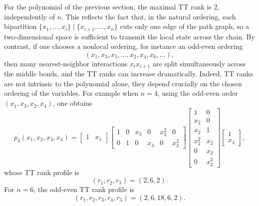 \documentclass[11pt,a4paper]{article}
\theoremstyle{definition}
\begin{document}
For the polynomial of the previous section, the maximal TT rank is \(2\), independently of \(n\). This reflects the fact that, in the natural ordering, each bipartition \(\{x_1,\dots,x_i\}\mid\{x_{i+1},\dots,x_n\}\) cuts only one edge of the path graph, so a two-dimensional space is sufficient to transmit the local state across the chain. By contrast, if one chooses a nonlocal ordering, for instance an odd-even ordering
\[
(x_1,x_3,x_5,\dots,x_2,x_4,x_6,\dots),
\]
then many nearest-neighbor interactions \(x_i x_{i+1}\) are split simultaneously across the middle bonds, and the TT ranks can increase dramatically. Indeed, TT ranks are not intrinsic to the polynomial alone, they depend crucially on the chosen ordering of the variables. For example when $n=4$, using the odd-even order \((x_1,x_3,x_2,x_4)\), 
one obtains
\[
p_4(x_1,x_2,x_3,x_4)=
\begin{bmatrix}1&x_1\end{bmatrix}
\begin{bmatrix}
1 & 0 & x_3 & 0 & x_3^2 & 0\\
0 & 1 & 0 & x_3 & 0 & x_3^2
\end{bmatrix}
\begin{bmatrix}
1 & 0\\
x_2 & 0\\
x_2 & 1\\
x_2^2 & x_2\\
0 & x_2\\
0 & x_2^2
\end{bmatrix}
\begin{bmatrix}
1\\
x_4
\end{bmatrix},
\]
whose TT rank profile is
\[
(r_1,r_2,r_3)=(2,6,2).
\]
For \(n=6\), the odd-even TT rank profile is
\[
(r_1,r_2,r_3,r_4,r_5)=(2,6,18,6,2).
\]
\end{document}
